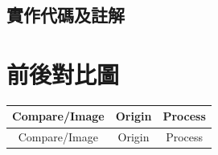 \documentclass[12pt,a4paper]{article}
\begin{document}
\subsection{實作代碼及註解}



\section{前後對比圖}

\begin{center}
    \begin{longtable}{|c|c|c|}
    \hline
        Compare/Image & Origin & Process \\
    \hline
    \endfirsthead
    
    \hline
        Compare/Image & Origin & Process \\
    \hline
    \endhead
    

\end{longtable}
\end{center}
\end{document}
